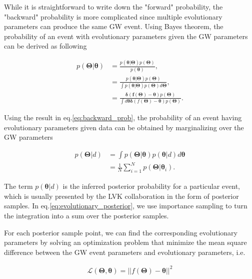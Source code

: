 \documentclass[twocolumn]{aastex631}
\begin{document}
While it is straightforward to write down the "forward" probability, the "backward" probability is more complicated since multiple evolutionary parameters can produce the same GW event.
Using Bayes theorem, the probability of an event with evolutionary parameters given the GW parameters can be derived as following

\begin{align}
    p(\bm{\Theta}|\bm{\theta}) &= \frac{p(\bm{\theta}|\bm{\Theta})p(\bm{\Theta})}{p(\bm{\theta})}, \nonumber \\
    &= \frac{p(\bm{\theta}|\bm{\Theta})p(\bm{\Theta})}{\int p(\bm{\theta}|\bm{\Theta}) p(\bm{\Theta}) d\bm{\Theta}}, \nonumber \\
    &= \frac{\bm{\delta}(\bm{f}(\bm{\Theta})-\bm{\theta})p(\bm{\Theta})}{\int d\bm{\theta} \bm{\delta}(f(\bm{\Theta})-\bm{\theta})p(\bm{\Theta})}.
\label{eq:backward_prob}
\end{align}

Using the result in eq.\ref{eq:backward_prob},
the probability of an event having evolutionary parameters given data can be obtained by marginalizing over the GW parameters

\begin{align}
    p(\bm{\Theta}|d) &= \int p(\bm{\Theta}|\bm{\theta}) p(\bm{\theta}|d) d\bm{\theta}\\
    &= \frac{1}{N}\sum_{i=1}^{N} p(\bm{\Theta}|\bm{\theta}_i). \label{eq:evolutionary_posterior}
\end{align}

The term $p(\bm{\theta}|d)$ is the inferred posterior probability for a particular event, which is usually presented by the LVK collaboration in the form of posterior samples.
In eq.\ref{eq:evolutionary_posterior}, we use importance sampling to turn the integration into a sum over the posterior samples.

For each posterior sample point, we can find the corresponding evolutionary parameters by solving an optimization problem that minimize the mean square difference between the GW event parameters and evolutionary parameters, i.e. 

\begin{align}
\mathcal{L}(\bm{\Theta},\bm{\theta}) = ||f(\bm{\Theta})-\bm{\theta}||^2
\label{eq:loss}
\end{align}
\end{document}
